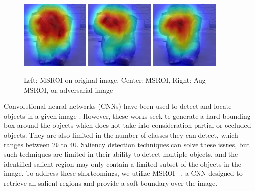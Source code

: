 \begin{figure}[H]
\centering
     \includegraphics[width=0.3\textwidth,angle=0,scale=0.7]{figures/protect/original_msroi.jpg}
     \includegraphics[width=0.3\textwidth,angle=0,scale=0.7]{figures/protect/adversarial_msroi.jpg}
     \includegraphics[width=0.3\textwidth,angle=0,scale=0.7]{figures/protect/MSROI_after.jpg}
     \label{fig:msroi}
          \caption[Multi-Structure ROI]{Left: MSROI on original image, Center: MSROI, Right: Aug-MSROI, on adversarial image}
 \end{figure}
 

Convolutional neural networks (CNNs) have been used to detect and locate objects in a given image \cite{Erhan2014ScalableOD,Zhao_2015_CVPR}. 
However, these works seek to generate a hard bounding box around the objects which does not take into consideration partial or occluded objects.
They are also limited in the number of classes they can detect, which ranges between $20$ to $40$.
Saliency detection techniques can solve these issues, but such techniques are limited in their ability to detect multiple objects, and the identified salient region may only contain a limited subset of the objects in the image.
To address these shortcomings, we utilize MSROI  ~\cite{Prakash2017SemanticPI}, a CNN designed to retrieve all salient regions and provide a soft boundary over the image.

